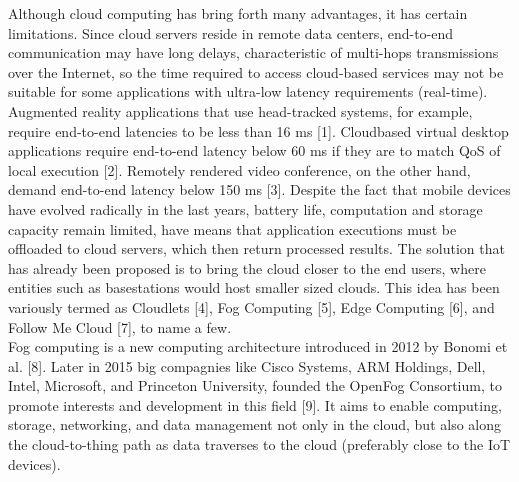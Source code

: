 \noindent\tab Although cloud computing has bring forth many advantages, it has certain limitations. Since cloud servers reside in remote data centers, end-to-end communication may have long delays, characteristic of multi-hops transmissions over the Internet, so the time required to access cloud-based services may not be suitable for some applications with ultra-low latency requirements (real-time). Augmented reality applications that use head-tracked systems, for example, require end-to-end latencies to be less than 16 ms [1]. Cloudbased virtual desktop applications require end-to-end latency
below 60 ms if they are to match QoS of local execution [2]. Remotely rendered video conference, on the other hand, demand end-to-end latency below 150 ms [3]. Despite the fact that mobile devices have evolved radically in the last years, battery life, computation and storage capacity remain limited, have means that application executions must be offloaded to cloud servers, which then return processed results. The solution that has already been proposed is to bring the cloud closer to the end users, where entities such as basestations would host smaller sized clouds. This idea has been variously termed as Cloudlets [4], Fog Computing [5], Edge Computing [6], and Follow Me Cloud [7], to name a few.\\
\noindent\tab Fog computing is a new computing architecture introduced in 2012 by Bonomi et al. [8]. Later in 2015 big compagnies like Cisco Systems, ARM Holdings, Dell, Intel, Microsoft, and Princeton University, founded the OpenFog Consortium, to promote interests and development in this field [9]. It aims to enable computing, storage, networking, and data management not only in the cloud, but also along the cloud-to-thing path as data traverses to the cloud (preferably close to the IoT devices).
